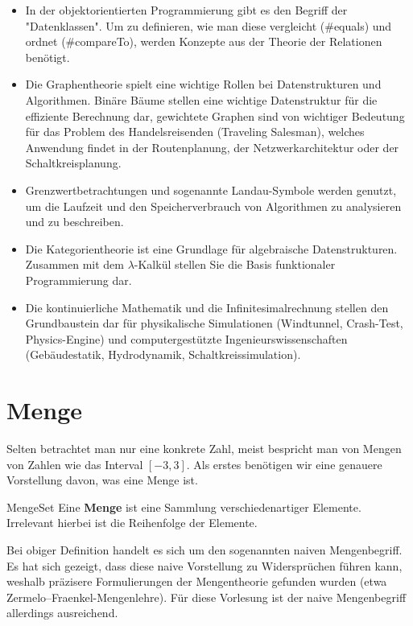 \begin{itemize}
	\item In der objektorientierten Programmierung gibt es den Begriff der "Datenklassen". Um zu definieren, wie man diese vergleicht (\#equals) und ordnet (\#compareTo), werden Konzepte aus der Theorie der Relationen benötigt.
	\item Die Graphentheorie spielt eine wichtige Rollen bei Datenstrukturen und Algorithmen. Binäre Bäume stellen eine wichtige Datenstruktur für die effiziente Berechnung dar, gewichtete Graphen sind von wichtiger Bedeutung für das Problem des Handelsreisenden (Traveling Salesman), welches Anwendung findet in der Routenplanung, der Netzwerkarchitektur oder der Schaltkreisplanung.
	\item Grenzwertbetrachtungen und sogenannte Landau-Symbole werden genutzt, um die Laufzeit und den Speicherverbrauch von Algorithmen zu analysieren und zu beschreiben.
	\item Die Kategorientheorie ist eine Grundlage für algebraische Datenstrukturen. Zusammen mit dem $\lambda$-Kalkül stellen Sie die Basis funktionaler Programmierung dar.
	\item Die kontinuierliche Mathematik und die Infinitesimalrechnung stellen den Grundbaustein dar für physikalische Simulationen (Windtunnel, Crash-Test, Physics-Engine) und computergestützte Ingenieurswissenschaften (Gebäudestatik, Hydrodynamik, Schaltkreissimulation).
\end{itemize}

\section{Menge}

Selten betrachtet man nur eine konkrete Zahl, meist bespricht man von Mengen von Zahlen wie das Interval $[-3,3]$.  Als erstes benötigen wir eine genauere Vorstellung davon, was eine Menge ist.

\begin{definition}{Menge}{Set}
    Eine \textbf{Menge} ist eine Sammlung verschiedenartiger Elemente. Irrelevant hierbei ist die Reihenfolge der Elemente.
\end{definition}

Bei obiger Definition handelt es sich um den sogenannten naiven Mengenbegriff. Es hat sich gezeigt, dass diese naive Vorstellung zu Widersprüchen führen kann, weshalb präzisere Formulierungen der Mengentheorie gefunden wurden (etwa Zermelo–Fraenkel-Mengenlehre). Für diese Vorlesung ist der naive Mengenbegriff allerdings ausreichend.


